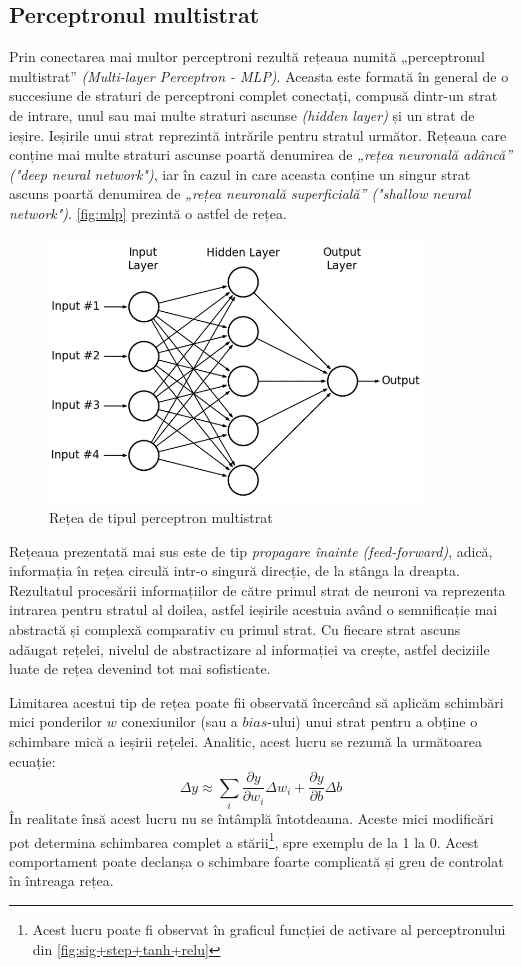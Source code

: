 \subsection{Perceptronul multistrat}
Prin conectarea mai multor perceptroni rezultă rețeaua numită „perceptronul multistrat” \textit{(Multi-layer Perceptron - MLP)}. Aceasta este formată în general de o succesiune de straturi de perceptroni complet conectați, compusă dintr-un strat de intrare, unul sau mai multe straturi ascunse \textit{(hidden layer)} și un strat de ieșire. Ieșirile unui strat reprezintă intrările pentru stratul următor. Rețeaua care conține mai multe straturi ascunse poartă denumirea de \textit{„rețea neuronală adâncă” ("deep neural network")}, iar în cazul in care aceasta conține un singur strat ascuns poartă denumirea de \textit{„rețea neuronală superficială” ("shallow neural network")}. \autoref{fig:mlp} prezintă o astfel de rețea. 
\begin{figure}[h]
\center
\includegraphics[width=10cm, keepaspectratio]{fig/cap2/mlp.png}
\caption{Rețea de tipul perceptron multistrat \cite{mlp-lakes}}
\label{fig:mlp}
\end{figure}

Rețeaua prezentată mai sus este de tip \textit{propagare înainte (feed-forward)}, adică, informația în rețea circulă intr-o singură direcție, de la stânga la dreapta. Rezultatul procesării informațiilor de către primul strat de neuroni va reprezenta intrarea pentru stratul al doilea, astfel ieșirile acestuia având o semnificație mai abstractă și complexă comparativ cu primul strat. Cu fiecare strat ascuns adăugat rețelei, nivelul de abstractizare al informației va crește, astfel deciziile luate de rețea devenind tot mai sofisticate.

Limitarea acestui tip de rețea poate fii observată încercând să aplicăm schimbări mici ponderilor $w$ conexiunilor (sau a $bias$-ului) unui strat pentru a obține o schimbare mică a ieșirii rețelei. Analitic, acest lucru se rezumă la următoarea ecuație:
\begin{equation}
\Delta y\approx\sum_i\frac{\partial y}{\partial w_i}\Delta w_i + \frac{\partial y}{\partial b}\Delta b
\end{equation}
În realitate însă acest lucru nu se întâmplă întotdeauna. Aceste mici modificări pot determina schimbarea complet a stării\footnote{Acest lucru poate fi observat în graficul funcției de activare al perceptronului din \autoref{fig:sig+step+tanh+relu}}, spre exemplu de la 1 la 0. Acest comportament poate declanșa o schimbare foarte complicată și greu de controlat în întreaga rețea.

